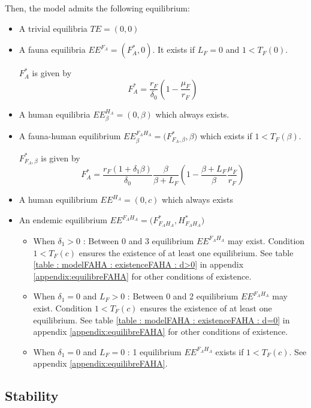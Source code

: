 \documentclass{article}
\begin{document}
Then, the model admits the following equilibrium:
\begin{itemize}
\item A trivial equilibria $TE= (0,0)$
\item A fauna equilibria $EE^{F_A} = (F_A^*, 0)$. It exists if $L_F = 0$ and $1 < T_F(0)$.

$F_A^*$ is given by
\begin{equation*}
F_A^* = \dfrac{r_F}{\delta_0}\left(1 - \dfrac{\mu_F}{r_F} \right)
\end{equation*}

\item A human equilibria $EE^{H_A}_\beta = (0, \beta)$ which always exists.
\item A fauna-human equilibrium $EE^{F_AH_A}_\beta = \Big(F^*_{F_A, \beta}, \beta\Big)$ which exists if $1 < T_F(\beta)$.

$F^*_{F_A, \beta}$ is given by
\begin{equation*}
F_A^* = \dfrac{r_F(1+\delta_1 \beta)}{\delta_0}\dfrac{\beta}{\beta + L_F}\left(1 - \dfrac{\beta + L_F}{\beta}\dfrac{\mu_F}{r_F} \right)
\end{equation*}

\item A human equilibrium $EE^{H_A} = (0, c)$ which always exists


\item An endemic equilibrium $EE^{F_AH_A} = \Big(F^*_{F_AH_A}, H^*_{F_AH_A}\Big)$
\begin{itemize}
\item When $\delta_1 > 0$ : Between 0 and 3 equilibrium $EE^{F_AH_A}$ may exist. Condition $1 < T_F(c)$ ensures the existence of at least one equilibrium. See table \ref{table : modelFAHA : existenceFAHA : d>0} in appendix \ref{appendix:equilibreFAHA} for other conditions of existence.
\item When $\delta_1 = 0$ and $L_F > 0$ : Between 0 and 2 equilibrium $EE^{F_AH_A}$ may exist. Condition $1 < T_F(c)$ ensures the existence of at least one equilibrium. See table \ref{table : modelFAHA : existenceFAHA : d=0} in appendix \ref{appendix:equilibreFAHA} for other conditions of existence.
\item When $\delta_1 = 0$ and $L_F = 0$ : 1 equilibrium $EE^{F_AH_A}$ exists if $1 < T_F(c)$. See appendix \ref{appendix:equilibreFAHA}.
\end{itemize}
\end{itemize}


\subsection{Stability}
\end{document}
